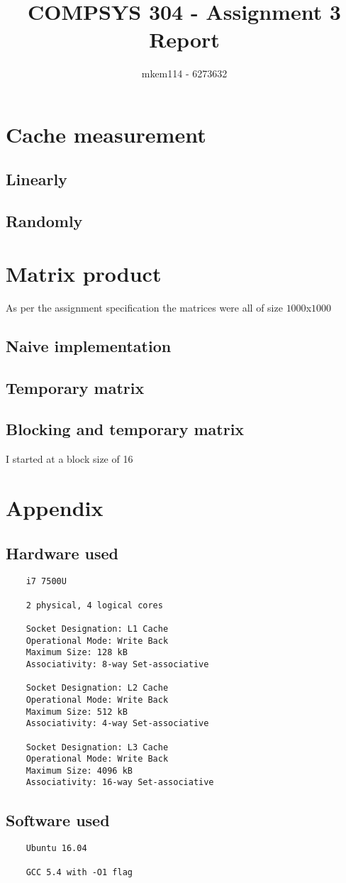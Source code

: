 \documentclass[10pt,a4paper,oneside]{article}
\author{mkem114 - 6273632}
\title{COMPSYS 304 - Assignment 3 Report}
\begin{document}
    \maketitle

    \section{Cache measurement}
    \subsection{Linearly}
    \subsection{Randomly}

    \section{Matrix product}
    As per the assignment specification the matrices were all of size $1000$x$1000$
    \subsection{Naive implementation}
    \subsection{Temporary matrix}
    \subsection{Blocking and temporary matrix}
    I started at a block size of 16

    \section*{Appendix}
        \subsection*{Hardware used}
            \begin{verbatim}
    i7 7500U

    2 physical, 4 logical cores

    Socket Designation: L1 Cache
    Operational Mode: Write Back
    Maximum Size: 128 kB
    Associativity: 8-way Set-associative

    Socket Designation: L2 Cache
    Operational Mode: Write Back
    Maximum Size: 512 kB
    Associativity: 4-way Set-associative

    Socket Designation: L3 Cache
    Operational Mode: Write Back
    Maximum Size: 4096 kB
    Associativity: 16-way Set-associative
            \end{verbatim}
        \subsection*{Software used}
            \begin{verbatim}
    Ubuntu 16.04

    GCC 5.4 with -O1 flag
            \end{verbatim}
\end{document}
